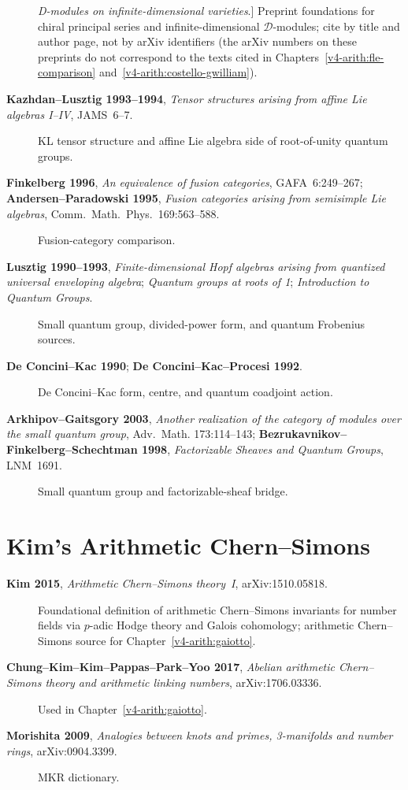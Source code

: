 \begin{description}
\emph{D-modules on infinite-dimensional varieties}.] Preprint
foundations for chiral principal series and infinite-dimensional
\(\mathcal{D}\)-modules; cite by title and author page, not by
arXiv identifiers (the arXiv numbers on these preprints do not
correspond to the texts cited in Chapters~\ref{v4-arith:fle-comparison}
and~\ref{v4-arith:costello-gwilliam}).
\item[\textbf{Kazhdan--Lusztig 1993--1994}, \emph{Tensor structures
arising from affine Lie algebras I--IV}, JAMS~6--7.] KL tensor
structure and affine Lie algebra side of root-of-unity quantum
groups.
\item[\textbf{Finkelberg 1996}, \emph{An equivalence of fusion
categories}, GAFA~6:249--267; \textbf{Andersen--Paradowski 1995},
\emph{Fusion categories arising from semisimple Lie algebras},
Comm.~Math.~Phys.~169:563--588.] Fusion-category comparison.
\item[\textbf{Lusztig 1990--1993}, \emph{Finite-dimensional Hopf
algebras arising from quantized universal enveloping algebra};
\emph{Quantum groups at roots of 1}; \emph{Introduction to Quantum
Groups}.] Small quantum group, divided-power form, and quantum
Frobenius sources.
\item[\textbf{De Concini--Kac 1990}; \textbf{De Concini--Kac--Procesi
1992}.] De Concini--Kac form, centre, and quantum coadjoint action.
\item[\textbf{Arkhipov--Gaitsgory 2003}, \emph{Another realization
of the category of modules over the small quantum group}, Adv.~Math.
173:114--143; \textbf{Bezrukavnikov--Finkelberg--Schechtman 1998},
\emph{Factorizable Sheaves and Quantum Groups}, LNM~1691.] Small
quantum group and factorizable-sheaf bridge.
\end{description}

\section{Kim's Arithmetic Chern--Simons}
\label{v4-arith:app:A:kim}

\begin{description}
\item[\textbf{Kim 2015}, \emph{Arithmetic Chern--Simons theory~I},
arXiv:1510.05818.] Foundational definition of arithmetic
Chern--Simons invariants for number fields via \(p\)-adic Hodge
theory and Galois cohomology; arithmetic Chern--Simons source
for Chapter~\ref{v4-arith:gaiotto}.
\item[\textbf{Chung--Kim--Kim--Pappas--Park--Yoo 2017}, \emph{Abelian
arithmetic Chern--Simons theory and arithmetic linking numbers},
arXiv:1706.03336.] Used in Chapter~\ref{v4-arith:gaiotto}.
\item[\textbf{Morishita 2009}, \emph{Analogies between knots and
primes, 3-manifolds and number rings}, arXiv:0904.3399.] MKR dictionary.
\end{description}


